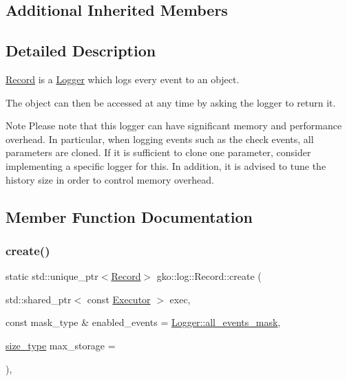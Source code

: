 \subsection*{Additional Inherited Members}


\subsection{Detailed Description}
\hyperlink{classgko_1_1log_1_1Record}{Record} is a \hyperlink{classgko_1_1log_1_1Logger}{Logger} which logs every event to an object. 

The object can then be accessed at any time by asking the logger to return it.

\begin{DoxyNote}{Note}
Please note that this logger can have significant memory and performance overhead. In particular, when logging events such as the {\ttfamily check} events, all parameters are cloned. If it is sufficient to clone one parameter, consider implementing a specific logger for this. In addition, it is advised to tune the history size in order to control memory overhead. 
\end{DoxyNote}


\subsection{Member Function Documentation}
\mbox{\label{classgko_1_1log_1_1Record_ab3863ff409b8ceaefa2f226a4e26debc}} 
\subsubsection{\texorpdfstring{create()}{create()}}
{\footnotesize\ttfamily static std\+::unique\+\_\+ptr$<$\hyperlink{classgko_1_1log_1_1Record}{Record}$>$ gko\+::log\+::\+Record\+::create (\begin{DoxyParamCaption}\item[{std\+::shared\+\_\+ptr$<$ const \hyperlink{classgko_1_1Executor}{Executor} $>$}]{exec,  }\item[{const mask\+\_\+type \&}]{enabled\+\_\+events = {\ttfamily \hyperlink{classgko_1_1log_1_1Logger_a02534863a2d2f92dfeb2c39038365532}{Logger\+::all\+\_\+events\+\_\+mask}},  }\item[{\hyperlink{namespacegko_a6e5c95df0ae4e47aab2f604a22d98ee7}{size\+\_\+type}}]{max\+\_\+storage = {} }\end{DoxyParamCaption})\hspace{0.3cm}{\ttfamily [inline]}, {\ttfamily [static]}}



